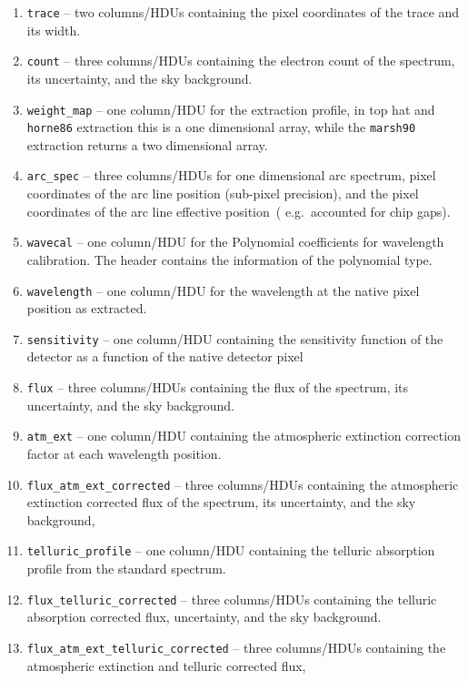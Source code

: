 \documentclass[linenumbers, twocolumn]{aastex631}
\begin{document}
\begin{enumerate}
    \item \texttt{trace} -- two columns/HDUs containing the pixel coordinates
    of the trace and its width.
    \item \texttt{count} -- three columns/HDUs containing the electron count
    of the spectrum, its uncertainty, and the sky background.
    \item \texttt{weight\_map} -- one column/HDU for the extraction profile,
    in top hat and \texttt{horne86} extraction this is a one dimensional array,
    while the \texttt{marsh90} extraction returns a two dimensional array.
    \item \texttt{arc\_spec} -- three columns/HDUs for one dimensional arc
    spectrum, pixel coordinates of the arc line position (sub-pixel precision),
    and the pixel coordinates of the arc line effective position~(
    e.g.\ accounted for chip gaps).
    \item \texttt{wavecal} -- one column/HDU for the Polynomial coefficients
    for wavelength calibration. The header contains the information of the
    polynomial type.
    \item \texttt{wavelength} -- one column/HDU for the wavelength at the
    native pixel position as extracted.
    \item \texttt{sensitivity} -- one column/HDU containing the sensitivity
    function of the detector as a function of the native detector pixel
    \item \texttt{flux} -- three columns/HDUs containing the
    flux of the spectrum, its uncertainty, and the sky background.
    \item \texttt{atm\_ext} -- one column/HDU containing the atmospheric
    extinction correction factor at each wavelength position.
    \item \texttt{flux\_atm\_ext\_corrected} -- three columns/HDUs containing
    the atmospheric extinction corrected flux of the spectrum, its
    uncertainty, and the sky background,
    \item \texttt{telluric\_profile} -- one column/HDU containing the telluric
    absorption profile from the standard spectrum.
    \item \texttt{flux\_telluric\_corrected} -- three columns/HDUs containing
    the telluric absorption corrected flux, uncertainty, and the sky
    background.
    \item \texttt{flux\_atm\_ext\_telluric\_corrected} -- three columns/HDUs
    containing the atmospheric extinction and telluric corrected flux,

\end{enumerate}
\end{document}
